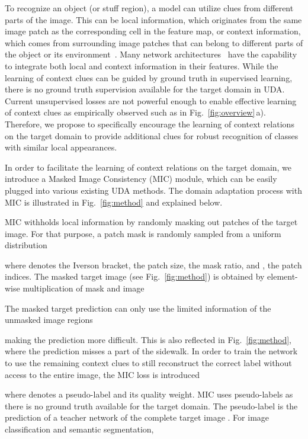 \documentclass[10pt,twocolumn,letterpaper]{article}
\begin{document}
To recognize an object (or stuff region), a model can utilize clues from different parts of the image. This can be local information, which originates from the same image patch as the corresponding cell in the feature map, or context information, which comes from surrounding image patches that can belong to different parts of the object or its environment~\cite{hoyer2019grid}. Many network architectures~\cite{he2016deep,dosovitskiy2020image} have the capability to integrate both local and context information in their features.
While the learning of context clues can be guided by ground truth in supervised learning, there is no ground truth supervision available for the target domain in UDA.
Current unsupervised losses are not powerful enough to enable effective learning of context clues as empirically observed such as in Fig.~\ref{fig:overview}\,a). Therefore, we propose to specifically encourage the learning of context relations on the target domain to provide additional clues for robust recognition of classes with similar local appearances.




In order to facilitate the learning of context relations on the target domain, we introduce a Masked Image Consistency (MIC) module, which can be easily plugged into various existing UDA methods. The domain adaptation process with MIC is illustrated in Fig.~\ref{fig:method} and explained below.

MIC withholds local information by randomly masking out patches of the target image. For that purpose, a patch mask  is randomly sampled from a uniform distribution

where  denotes the Iverson bracket,  the patch size,  the mask ratio, and ,  the patch indices. The masked target image  (see Fig.~\ref{fig:method}) is obtained by element-wise multiplication of mask and image

The masked target prediction  can only use the limited information of the unmasked image regions

making the prediction more difficult. This is also reflected in Fig.~\ref{fig:method}, where the prediction misses a part of the sidewalk. 
In order to train the network to use the remaining context clues to still reconstruct the correct label without access to the entire image, the MIC loss  is introduced

where  denotes a pseudo-label and  its quality weight. 
MIC uses pseudo-labels as there is no ground truth available for the target domain. The pseudo-label is the prediction of a teacher network  of the complete target image . For image classification and semantic segmentation,
\end{document}
